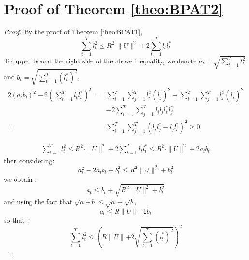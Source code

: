 \documentclass[preprint,12pt,authoryear]{elsarticle}
\begin{document}
\section{Proof of Theorem \ref{theo:BPAT2}}\label{app:thm2}
\begin{proof}
	By the proof of Theorem \ref{theo:BPAT1}, 
	\[\sum_{t=1}^{T}l_t^2 \leqslant R^2\cdot \parallel{U}\parallel^2 + 2\sum_{t=1}^{T}l_t l_t^{\ast}\]
	To upper bound the right side of the above inequality, we denote $a_t = \sqrt{\sum_{t=1}^{T}l_t^2}$ and $b_t = \sqrt{\sum_{t=1}^{T}(l_t^{\ast})^2}$, 
	\begin{align}
	2(a_tb_t)^2-2(\sum_{t=1}^{T}l_tl_t^{\ast})^2 =& \sum_{i=1}^{T}\sum_{j=1}^{T}l_i^2(l_j^{\ast})^2+\sum_{i=1}^{T}\sum_{j=1}^{T}l_j^2(l_i^{\ast})^2 \nonumber\\
	&- 2\sum_{i=1}^{T}\sum_{j=1}^{T}l_il_jl_i^{\ast}l_j^{\ast}\nonumber\\
	=& \sum_{i=1}^{T}\sum_{j=1}^{T}(l_il_j^{\ast}-l_jl_i^{\ast})^2 \geqslant 0 \nonumber
	\end{align}
	
	\begin{align}
	\sum_{t=1}^{T}l_t^2 \leqslant R^2 \cdot \parallel{U}\parallel^2+2\sum_{t=1}^{T}l_tl_t^{\ast}\leqslant R^2 \cdot \parallel{U}\parallel^2+2a_tb_t\nonumber
	\end{align}
	then considering:
	\[a_t^2 -2 a_tb_t+b_t^2\leqslant R^2\parallel{U}\parallel^2+b_t^2\]
	we obtain :
	\[a_t \leqslant b_t+\sqrt{R^2\parallel{U}\parallel^2+b_t^2}\]
	and using the fact that $\sqrt{a+b}\leqslant \sqrt{a}+\sqrt{b}$,
	\[a_t \leqslant R\parallel{U}\parallel+2 b_t\]
	so that :
	\[\sum_{t=1}^{T}l_t^2 \leqslant \left(R\parallel{U}\parallel+2 \sqrt{\sum_{t=1}^{T}(l_t^{\ast})^2}\right)^2 \]
\end{proof}

 

\end{document}
